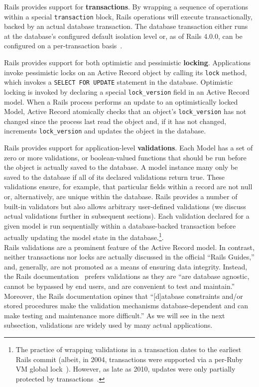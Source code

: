 \begin{myenumerate}
\item Rails provides support for \textbf{transactions}. By wrapping a
sequence of operations within a special \texttt{transaction} block,
Rails operations will execute transactionally, backed by an actual
database transaction. The database transaction either runs at the
database's configured default isolation level or, as of Rails 4.0.0, can
be configured on a per-transaction
basis~\cite{code-transaction-isolation}.

\item Rails provides support for both optimistic and pessimistic
\textbf{locking}. Applications invoke pessimistic locks on an Active
Record object by calling its \texttt{lock} method, which invokes a
\texttt{SELECT FOR UPDATE} statement in the database. Optimistic
locking is invoked by declaring a special \texttt{lock\_version} field
in an Active Record model. When a Rails process performs an update to
an optimistically locked Model, Active Record atomically checks that an object's
\texttt{lock\_version} has not changed since the process last read the
object and, if it has not changed, increments \texttt{lock\_version}
and updates the object in the database.

\item Rails provides support for application-level
  \textbf{validations}. Each Model has a set of zero or more
  validations, or boolean-valued functions that should be run before
  the object is actually saved to the database. A model instance many
  only be saved to the database if all of its declared validations
  return true. These validations ensure, for example, that particular
  fields within a record are not null or, alternatively, are unique
  within the database. Rails provides a number of built-in validators
  but also allows arbitrary user-defined validations (we discuss
  actual validations further in subsequent sections). Each validation
  declared for a given model is run sequentially within a
  database-backed transaction before actually updating the model state
  in the database.\footnote{The practice
    of wrapping validations in a transaction dates to the earliest
    Rails commit (albeit, in 2004, transactions were supported via a
    per-Ruby VM global lock~\cite{code-txn-lock}). However,
    as late as 2010, updates were only partially protected by
    transactions~\cite{code-txn-update}.}.\\[-2mm]

  Rails validations are a prominent feature of the Active Record
  model. In contrast, neither transactions nor locks are actually
  discussed in the official ``Rails Guides,'' and, generally, are not
  promoted as a means of ensuring data integrity. Instead, the Rails
  documentation~\cite{rails-guide} prefers validations as they are
  ``are database agnostic, cannot be bypassed by end users, and are
  convenient to test and maintain.'' Moreover, the Rails documentation
  opines that ``[d]atabase constraints and/or stored procedures make
  the validation mechanisms database-dependent and can make testing
  and maintenance more difficult.'' As we will see in the next
  subsection, validations are widely used by many actual applications.


\end{myenumerate}
